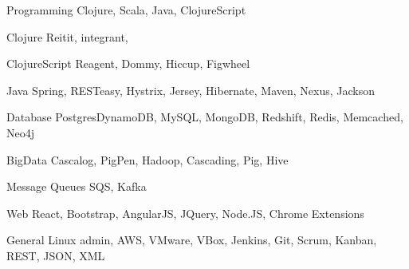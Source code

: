 

\begin{cvskills}

  \cvskill
    {Programming} %
    {Clojure, Scala, Java, ClojureScript} %
    
  \cvskill
    {Clojure} %
    {Reitit, integrant, } %
    
  \cvskill
    {ClojureScript} %
    {Reagent, Dommy, Hiccup, Figwheel} %
    
  \cvskill
    {Java} %
    {Spring, RESTeasy, Hystrix, Jersey, Hibernate, Maven, Nexus, Jackson} %

  \cvskill
    {Database} %
    {PostgresDynamoDB, MySQL, MongoDB, Redshift, Redis, Memcached, Neo4j} %

  \cvskill
    {BigData} %
    {Cascalog, PigPen, Hadoop, Cascading, Pig, Hive} %
  
  \cvskill
    {Message Queues} %
    {SQS, Kafka} %
    
  \cvskill
    {Web} %
    {React, Bootstrap, AngularJS, JQuery, Node.JS, Chrome Extensions} %
    
   \cvskill
    {General} %
    {Linux admin, AWS, VMware, VBox, Jenkins, Git, Scrum, Kanban, REST, JSON, XML}
\end{cvskills}
